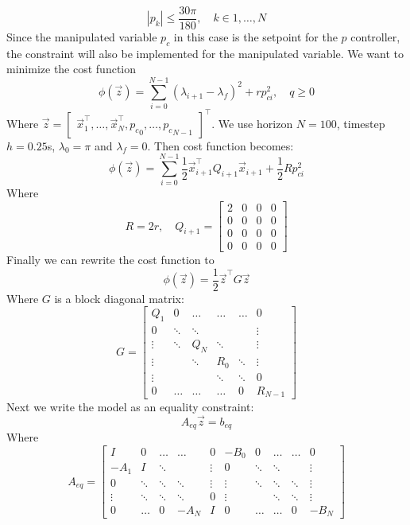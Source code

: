 \begin{equation}
    |p_k| \leq \frac{30\pi}{180},\quad k \in {1,\dots,N}
\end{equation}
Since the manipulated variable $p_c$ in this case is the setpoint for the $p$ controller, the constraint will also be implemented for the manipulated variable. We want to minimize the cost function 
\begin{equation}\label{eq:cost_function}
    \phi(\vec{z}) = \sum_{i=0}^{N-1}(\lambda_{i+1}-\lambda_f)^2 + rp_{ci}^2, \quad q\geq0
\end{equation}
Where $\vec{z}=\begin{bmatrix} \vec{x}_1^\top, \dots, \vec{x}_N^\top, {p_c}_{0}, \dots, {p_c}_{N-1} \end{bmatrix}^\top$. We use horizon $N = 100$, timestep $h=0.25$s, $\lambda_0 = \pi$ and $\lambda_f = 0$. 
Then cost function becomes:
\begin{equation}
    \phi(\vec{z}) = \sum_{i=0}^{N-1}\frac12\vec{x}_{i+1}^\top Q_{i+1} \vec{x}_{i+1}+ \frac12Rp_{ci}^2
\end{equation}
Where $$R = 2r, \quad Q_{i+1} = \begin{bmatrix} 2&0&0&0 \\0&0&0&0 \\0&0&0&0 \\0&0&0&0\end{bmatrix}$$
Finally we can rewrite the cost function to
\begin{equation}
    \phi(\vec{z}) = \frac12\vec{z}^\top G \vec{z}
\end{equation}
Where $G$ is a block diagonal matrix:
\begin{equation}
G = 
    \begin{bmatrix}
    Q_1 &0&\dots&\dots&\dots&0 \\
    0 &\ddots&\ddots&&&\vdots \\ 
    \vdots &\ddots&Q_N&\ddots&&\vdots \\ 
    \vdots &&\ddots&R_0&\ddots&\vdots \\ 
    \vdots &&&\ddots&\ddots&0 \\
    0&\dots&\dots&\dots&0&R_{N-1}
    \end{bmatrix}
\end{equation}
Next we write the model as an equality constraint:
\begin{equation}\label{eq:equality_constrains}
A_{eq}\vec{z}=b_{eq}
\end{equation}
Where $$A_{eq}= 
\left[
\begin{array}{ccccc|ccccc}
I & 0 & \dots & \dots & 0  &-B_0 &0&\dots&\dots&0\\
-A_1 & I &\ddots& & \vdots  &0 &\ddots&\ddots&&\vdots\\
0 &\ddots&\ddots&\ddots&\vdots  &\vdots &\ddots&\ddots&\ddots&\vdots\\
\vdots &\ddots&\ddots&\ddots&0&\vdots&&\ddots&\ddots&\vdots\\
0 &\dots&0&-A_N&I  & 0 &\dots&\dots&0&-B_N
\end{array}
\right]$$

